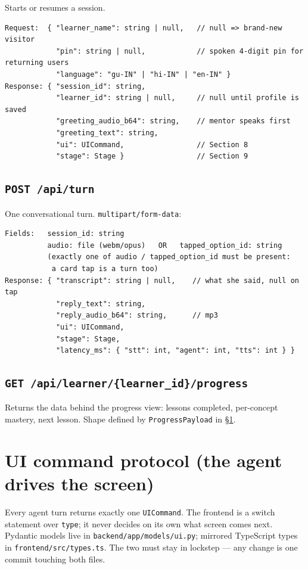 \documentclass[11pt]{article}
\newcommand{\code}[1]{\texttt{#1}}
\begin{document}
Starts or resumes a session.

\begin{verbatim}
Request:  { "learner_name": string | null,   // null => brand-new visitor
            "pin": string | null,            // spoken 4-digit pin for returning users
            "language": "gu-IN" | "hi-IN" | "en-IN" }
Response: { "session_id": string,
            "learner_id": string | null,     // null until profile is saved
            "greeting_audio_b64": string,    // mentor speaks first
            "greeting_text": string,
            "ui": UICommand,                 // Section 8
            "stage": Stage }                 // Section 9
\end{verbatim}

\subsection{\code{POST /api/turn}}

One conversational turn. \code{multipart/form-data}:

\begin{verbatim}
Fields:   session_id: string
          audio: file (webm/opus)   OR   tapped_option_id: string
          (exactly one of audio / tapped_option_id must be present:
           a card tap is a turn too)
Response: { "transcript": string | null,    // what she said, null on tap
            "reply_text": string,
            "reply_audio_b64": string,      // mp3
            "ui": UICommand,
            "stage": Stage,
            "latency_ms": { "stt": int, "agent": int, "tts": int } }
\end{verbatim}

\subsection{\code{GET /api/learner/\{learner\_id\}/progress}}

Returns the data behind the progress view: lessons completed, per-concept mastery, next lesson. Shape defined by \code{ProgressPayload} in \S\ref{sec:ui}.

\section{UI command protocol (the agent drives the screen)}
\label{sec:ui}

Every agent turn returns exactly one \code{UICommand}. The frontend is a switch statement over \code{type}; it never decides on its own what screen comes next. Pydantic models live in \code{backend/app/models/ui.py}; mirrored TypeScript types in \code{frontend/src/types.ts}. The two must stay in lockstep --- any change is one commit touching both files.
\end{document}
